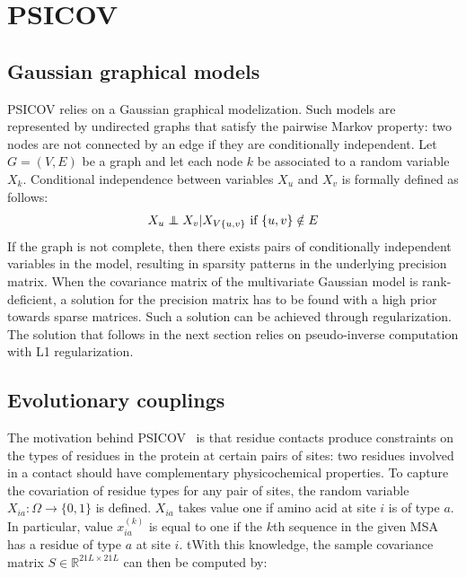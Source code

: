 \section{PSICOV}

    \subsection{Gaussian graphical models} 

        PSICOV relies on a Gaussian graphical modelization. Such models are represented by undirected graphs that
        satisfy the pairwise Markov property: two nodes are not connected by an edge if they are conditionally independent.
        Let $G = (V, E)$ be a graph and let each node $k$ be associated to a random variable $X_k$.
        Conditional independence between variables $X_u$ and $X_v$ is formally defined as follows:
        \begin{equation}
            X_u \independent X_v \vert X_{V \\ \{u, v\}} \, \, \text{if } \{u, v\} \notin E
        \end{equation}
        If the graph is not complete, then there exists pairs of conditionally independent variables in the model,
        resulting in sparsity patterns in the underlying precision matrix.
        When the covariance matrix of the multivariate Gaussian model is rank-deficient, a solution for the precision
        matrix has to be found with a high prior towards sparse matrices. Such a solution can be achieved through
        regularization. The solution that follows in the next section relies on pseudo-inverse computation
        with L1 regularization.

    \subsection{Evolutionary couplings} \label{graphicalmodels}

        The motivation behind PSICOV~\cite{doi:10.1093/bioinformatics/btr638} is that residue contacts produce constraints on the types of residues in the
        protein at certain pairs of sites: two residues involved in a contact should have complementary physicochemical properties. To capture the covariation
        of residue types for any pair of sites, the random variable $X_{ia}: \Omega \rightarrow \{0, 1\}$ is defined. $X_{ia}$ takes value one if
        amino acid at site $i$ is of type $a$. In particular, value $x_{ia}^{(k)}$ is equal to one if the $k$th sequence in the given MSA has a residue of type $a$
        at site $i$. tWith this knowledge, the sample covariance matrix $S \in \mathbb{R}^{21 L \times 21 L}$ can then be computed by:

